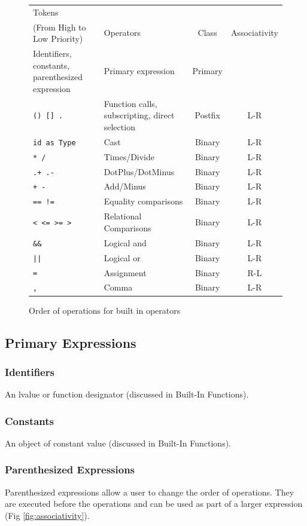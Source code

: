 \documentclass[12pt,A4]{book}
\begin{document}
\begin{figure}
\center
\begin{tabular}{|p{}|p{}|c|c|}
\hline
Tokens\\(From High to Low Priority) & Operators & Class & Associativity \\ \hline
Identifiers, constants, parenthesized expression & Primary expression & Primary	& \\ \hline
\verb|() [] .|	& Function calls, subscripting, direct selection & Postfix & L-R \\ \hline
\verb|id as Type| & Cast & Binary & L-R \\ \hline
\verb|* /| &	Times/Divide	& Binary &	L-R \\ \hline
\verb|.+ .-| &	DotPlus/DotMinus	& Binary &	L-R \\ \hline
\verb|+ -| &	Add/Minus	& Binary &	L-R \\ \hline
\verb|== !=| & Equality comparisons & Binary & L-R \\ \hline
\verb|< <= >= >| & Relational Comparisons & Binary & L-R \\ \hline
\verb|&&| &	Logical and	& Binary	& L-R \\ \hline
\verb.||.	& Logical or & Binary & L-R \\ \hline
\verb|=| &	Assignment  & 	Binary & R-L \\ \hline
\verb|,| & Comma & Binary & L-R \\ \hline
\end{tabular}
\label{fig:order_of_operations}
\caption{Order of operations for built in operators}
\end{figure}

\subsection{Primary Expressions}
\subsubsection{Identifiers}
An lvalue or function designator (discussed in Built-In Functions).
\subsubsection{Constants}
An object of constant value (discussed in Built-In Functions).
\subsubsection{Parenthesized Expressions}
Parenthesized expressions allow a user to change the order of operations. They are executed before the operations and can be used as part of a larger expression (Fig \ref{fig:associativity}).
\end{document}

